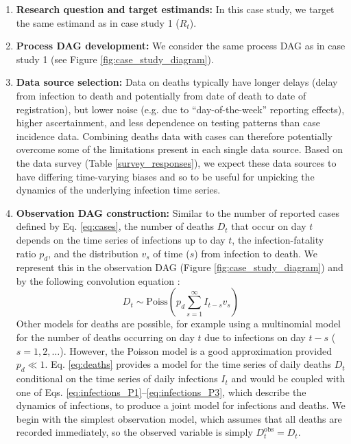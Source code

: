 \documentclass{article}
\begin{document}
\begin{enumerate}
   \item \textbf{Research question and target estimands:}  In this case study, we target the same estimand as in case study 1 ($R_t$). 
   
    \item \textbf{Process DAG development:} We consider the same process DAG as in case study 1 (see Figure \ref{fig:case_study_diagram}).
        
    \item \textbf{Data source selection:} Data on deaths typically have longer delays (delay from infection to death and potentially from date of death to date of registration), but lower noise (e.g. due to ``day-of-the-week'' reporting effects), higher ascertainment, and less dependence on testing patterns than case incidence data. Combining deaths data with cases can therefore potentially overcome some of the limitations present in each single data source. Based on the data survey (Table \ref{survey_responses}), we expect these data sources to have differing time-varying biases and so to be useful for unpicking the dynamics of the underlying infection time series.
    
    \item \textbf{Observation DAG construction:} Similar to the number of reported cases defined by Eq. \eqref{eq:cases}, the number of deaths $D_t$ that occur on day $t$ depends on the time series of infections up to day $t$, the infection-fatality ratio $p_d$, and the distribution $v_s$ of time ($s$) from infection to death. We represent this in the observation DAG (Figure \ref{fig:case_study_diagram}) and by the following convolution equation \citep{bhatt2023semi}:
    \begin{equation} \label{eq:deaths}
        D_t \sim \mathrm{Poiss}\left(p_d \sum_{s=1}^\infty I_{t-s}v_s \right)
    \end{equation}
    Other models for deaths are possible, for example using a multinomial model for the number of deaths occurring on day $t$ due to infections on day $t-s$ ($s=1,2,\ldots$). However, the Poisson model is a good approximation provided $p_d\ll 1$. 
    Eq. \eqref{eq:deaths} provides a model for the time series of daily deaths $D_t$ conditional on the time series of daily infections $I_t$ and would be coupled with one of Eqs. \eqref{eq:infections_P1}--\eqref{eq:infections_P3}, which describe the dynamics of infections, to produce a joint model for infections and deaths. We begin with the simplest observation model, which assumes that all deaths are recorded immediately, so the observed variable is simply $D^\mathrm{obs}_t=D_t$.
    



\end{enumerate}
\end{document}
